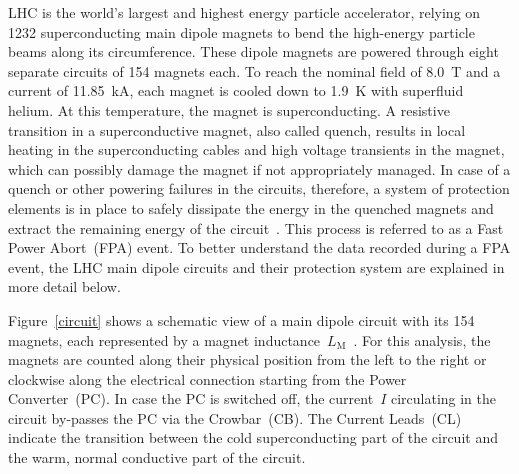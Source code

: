 \documentclass[lettersize,journal]{IEEEtran}
\begin{document}
 LHC is the world's largest and highest energy particle accelerator, relying on 1232 superconducting main dipole magnets to bend the high-energy particle beams along its circumference. These dipole magnets are powered through eight separate circuits of 154 magnets each.
To reach the nominal field of 8.0~T and a current of 11.85~kA, each magnet is cooled down to 1.9~K with superfluid helium. 
At this temperature, the magnet is superconducting.
A resistive transition in a superconductive magnet, also called quench, results in local heating in the superconducting cables and high voltage transients in the magnet, which can possibly damage the magnet if not appropriately managed.
In case of a quench or other powering failures in the circuits, therefore, a system of protection elements is in place to safely dissipate the energy in the quenched magnets and extract the remaining energy of the circuit~\cite{Schultz2002}.
This process is referred to as a Fast Power Abort~(FPA) event. To better understand the data recorded during a FPA event, the LHC main dipole circuits and their protection system are explained in more detail below.

Figure~\ref{circuit} shows a schematic view of a main dipole circuit with its 154 magnets, each represented by a magnet inductance~$L_\text{M}$~\cite{ravaioli2012}.
For this analysis, the magnets are counted along their physical position from the left to the right or clockwise along the electrical connection starting from the Power Converter~(PC). 
In case the PC is switched off, the current~$I$ circulating in the circuit by-passes the PC via the Crowbar~(CB).
The Current Leads~(CL) indicate the transition between the cold superconducting part of the circuit and the warm, normal conductive part of the circuit.
\end{document}
